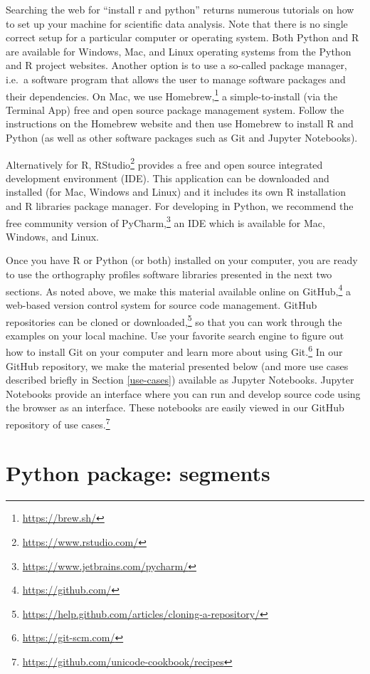 \documentclass[output=book,nonflat,modfonts,
citecolor=brown,
		]{langsci/langscibook}\usepackage[]{graphicx}\usepackage[]{color}
\begin{document}
Searching the web for ``install r and python'' returns numerous tutorials on how to set up your machine for scientific data analysis. Note that there is no single correct setup for a particular computer or operating system. Both Python and R are available for Windows, Mac, and Linux operating systems from the Python and R project websites. Another option is to use a so-called package manager, i.e.\ a software program that allows the user to manage software packages and their dependencies. On Mac, we use Homebrew,\footnote{\url{https://brew.sh/}} a simple-to-install (via the Terminal App) free and open source package management system. Follow the instructions on the Homebrew website and then use Homebrew to install R and Python (as well as other software packages such as Git and Jupyter Notebooks). 

Alternatively for R, RStudio\footnote{\url{https://www.rstudio.com/}} provides a free and open source integrated development environment (IDE). This application can be downloaded and installed (for Mac, Windows and Linux) and it includes its own R installation and R libraries package manager. For developing in Python, we recommend the free community version of PyCharm,\footnote{\url{https://www.jetbrains.com/pycharm/}} an IDE which is available for Mac, Windows, and Linux. 

Once you have R or Python (or both) installed on your computer, you are ready to use the orthography profiles software libraries presented in the next two sections. As noted above, we make this material available online on GitHub,\footnote{\url{https://github.com/}} a web-based version control system for source code management. GitHub repositories can be cloned or downloaded,\footnote{\url{https://help.github.com/articles/cloning-a-repository/}} so that you can work through the examples on your local machine. Use your favorite search engine to figure out how to install Git on your computer and learn more about using Git.\footnote{\url{https://git-scm.com/}} In our GitHub repository, we make the material presented below (and more use cases described briefly in Section \ref{use-cases}) available as Jupyter Notebooks. Jupyter Notebooks provide an interface where you can run and develop source code using the browser as an interface. These notebooks are easily viewed in our GitHub repository of use cases.\footnote{\url{https://github.com/unicode-cookbook/recipes}}



\section{Python package: segments}
\label{python-implementations}
\end{document}
